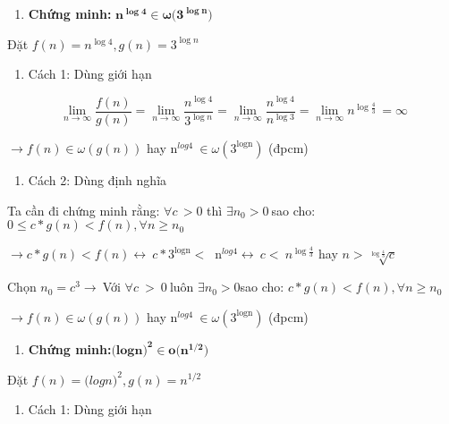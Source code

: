\documentclass[
]{article}
\begin{document}
\begin{enumerate}
\item
  \textbf{Chứng minh:}
  \(\mathbf{n}^{\mathbf{\log}\mathbf{4}}\mathbf{\in \omega(}\mathbf{3}^{\mathbf{\log}\mathbf{n}}\mathbf{)}\)
\end{enumerate}

Đặt \(f(n) = n^{\log 4},g(n) = 3^{\log n}\)

\begin{enumerate}
\item
  Cách 1: Dùng giới hạn
\end{enumerate}

\[\ \lim_{n \rightarrow \infty}\frac{f(n)}{g(n)} = \lim_{n \rightarrow \infty}\frac{n^{\log 4}}{3^{\log n}} = \lim_{n \rightarrow \infty}\frac{n^{\log 4}}{n^{\log 3}} = \lim_{n \rightarrow \infty}n^{\log\frac{4}{3}}\, = \infty\]

\(\rightarrow f(n) \in \omega(g(n))\)
hay\(\text{\ n}^{log4}\  \in \omega\left( 3^{\text{logn}} \right)\)
(đpcm)

\begin{enumerate}
\item
  Cách 2: Dùng định nghĩa
\end{enumerate}

Ta cần đi chứng minh rằng: \(\forall c\, > 0\) thì
\(\exists n_{0} > 0\ \)sao cho:
\(0 \leq c*g(n) < f(n),\forall n \geq n_{0}\)

\(\rightarrow c*g(n) < f(n) \leftrightarrow \ c*3^{\text{logn}} < \ \text{\ n}^{log4} \leftrightarrow \ c < \ n^{\log\frac{4}{3}}\)
hay \(n > \sqrt[{\log\frac{4}{3}}]{c}\)

Chọn \(n_{0} = c^{3} \rightarrow \ \)Với \(\forall c\  > \ 0\ \)luôn
\(\exists n_{0} > 0\)sao cho: \(c*g(n) < f(n),\forall n \geq n_{0}\)

\(\rightarrow f(n) \in \omega(g(n))\)
hay\(\text{\ n}^{log4}\  \in \omega\left( 3^{\text{logn}} \right)\)
(đpcm)

\begin{enumerate}
\item
  \textbf{Chứng
  minh:}\({\mathbf{(log}\mathbf{n)}}^{\mathbf{2}}\mathbf{\in o(}\mathbf{n}^{\mathbf{1/2}}\mathbf{)}\)
\end{enumerate}

Đặt \(f(n) = {{(log}{n)}}^{2},g(n) = n^{1/2}\)

\begin{enumerate}
\item
  Cách 1: Dùng giới hạn
\end{enumerate}
\end{document}
